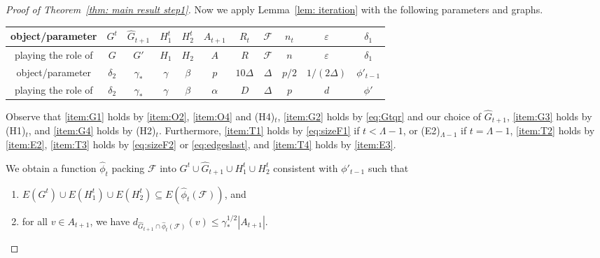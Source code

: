 \documentclass[a4paper, 11pt, reqno]{amsart}
\numberwithin{equation}{section}
\newcommand{\1}{{\rm 1\hspace*{-0.4ex}%
\rule{0.1ex}{1.52ex}\hspace*{0.2ex}}}
\newcommand{\cF}{\mathcal{F}}
\renewcommand{\epsilon}{\varepsilon}
\newcounter{step}
\begin{document}
\begin{proof}[Proof of Theorem~\ref{thm: main result step1}]
Now we apply Lemma~\ref{lem: iteration} with the following parameters and graphs. \newline
  
\noindent
{
\begin{tabular}{c|c|c|c|c|c|c|c|c|c|c}
object/parameter & $G^t$ & $\hat{G}_{t+1}$ & $H^t_1$ & $H^t_2$ & $A_{t+1}$ & $R_t$ & $\cF$ & $n_t$ & $\epsilon$ & $\delta_1$
\\ \hline
playing the role of & $G$ & $G'$ & $H_1$ & $H_2$ & $A$ & $R$ & $\cF$ & $n$ & $\epsilon$ & $\delta_1$
\\ \hline 
\hline
object/parameter & $\delta_2$ & $\gamma_*$ & $\gamma$ & $\beta$ & $p$ & $ 10\Delta$ & $\Delta$ & $p/2$ & $1/(2\Delta)$ & $\phi'_{t-1}$ 
\\ \hline
playing the role of & $\delta_2$ & $\gamma_*$ & $\gamma$ & $\beta$ & $\alpha$ & $D$ & $\Delta$ & $p$ & $d$ & $\phi'$ 
\end{tabular}
}\newline \vspace{0.2cm}

Observe that 
\ref{item:G1} holds by \ref{item:O2}, \ref{item:O4} and (H4)$_t$,
\ref{item:G2} holds by \eqref{eq:Gtqr} and our choice of $\hat{G}_{t+1}$,
\ref{item:G3} holds by (H1)$_t$, and
\ref{item:G4} holds by (H2)$_t$.
Furthermore, 
\ref{item:T1} holds by \eqref{eq:sizeF1} if $t<\Lambda-1$, or (E2)$_{\Lambda-1}$ if $t=\Lambda-1$,
\ref{item:T2} holds by \ref{item:E2},
\ref{item:T3} holds by \eqref{eq:sizeF2} or \eqref{eq:edgeslast}, and
\ref{item:T4} holds by \ref{item:E3}.

We obtain a function $\hat{\phi}_{t}$ packing $\cF$ into $G^t\cup \hat{G}_{t+1}\cup H^t_1\cup H^t_2$ consistent with $\phi'_{t-1}$ 
such that 
\begin{enumerate}[label=$(\Phi\arabic*)_t$]
	\item\label{item:Phi1t} $E(G^t)\cup E(H^t_1)\cup E(H^t_2) \subseteq E(\hat{\phi}_{t}(\cF))$, and
	\item\label{item:Phi2t} for all $v\in A_{t+1}$, we have $d_{\hat{G}_{t+1}\cap \hat{\phi}_t(\cF)}(v)\leq \gamma_*^{1/2}|A_{t+1}|$.
\end{enumerate}


\end{proof}
\end{document}
